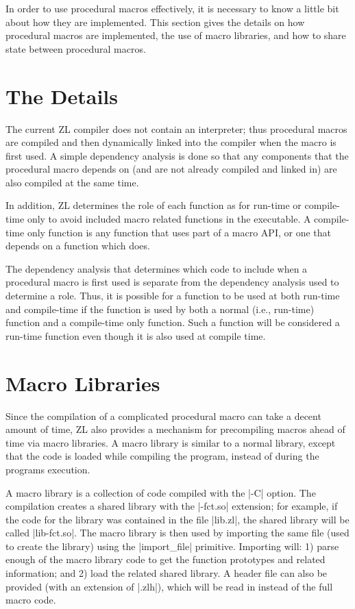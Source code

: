 In order to use procedural macros effectively, it is necessary to know
a little bit about how they are implemented.  This section gives
the details on how procedural macros are implemented, the use of macro
libraries, and how to share state between procedural macros.

\section{The Details}

The current ZL compiler does not contain an interpreter; thus
procedural macros are compiled and then dynamically linked into the
compiler when the macro is first used.  A simple dependency analysis
is done so that any components that the procedural macro depends on
(and are not already compiled and linked in) are also compiled at the
same time.

In addition, ZL determines the role of each function as for run-time or
compile-time only to avoid included macro related functions in the
executable.  A compile-time only function is any function that uses
part of a macro API, or one that depends on a function which does.

The dependency analysis that determines which code to include when a
procedural macro is first used is separate from the dependency
analysis used to determine a role.  Thus, it is possible for a
function to be used at both run-time and compile-time if the function
is used by both a normal (i.e., run-time) function and a compile-time
only function.  Such a function will be considered a run-time function
even though it is also used at compile time.

\section{Macro Libraries}

Since the compilation of a complicated procedural macro can take a
decent amount of time, ZL also provides a mechanism for precompiling
macros ahead of time via macro libraries.  A macro library is similar
to a normal library, except that the code is loaded while compiling the
program, instead of during the programs execution.

A macro library is a collection of code compiled with the |-C| option.
The compilation creates a shared library with the |-fct.so|
extension; for example, if the code for the library was contained in
the file |lib.zl|, the shared library will be called |lib-fct.so|.  The
macro library is then used by importing the same file (used to create
the library) using the |import_file| primitive.  Importing will:
1) parse enough of the macro library code to get the function
prototypes and related information; and 2) load the related shared
library.  A header file can also be provided (with an extension of
|.zlh|), which will be read in instead of the full macro code.

